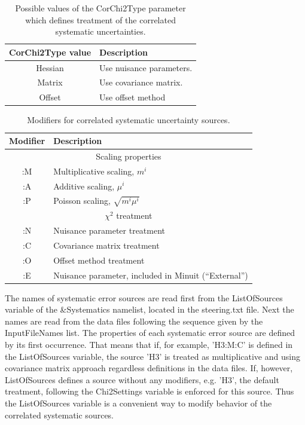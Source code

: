\begin{table}
\begin{center}
\begin{tabular}{cl}
\hline
    {\sc CorChi2Type} value &  Description \\
\hline
  {\sc Hessian}             & Use nuisance parameters.\\
  {\sc Matrix }             & Use covariance matrix. \\
  {\sc Offset }             & Use offset method\\
\hline
\end{tabular}
\end{center}
\caption{\label{tab:Chi2Type}Possible values of the {\sc CorChi2Type} parameter which defines treatment of the correlated systematic uncertainties.}
\end{table}
 
\begin{table}
\begin{center}
\begin{tabular}{cl}
\hline
  Modifier &  Description \\
\hline
   \multicolumn{2}{c}{Scaling properties}\\
  {\sc :M}  &  Multiplicative scaling, $ m^i$ \\
  {\sc :A}  &  Additive scaling, $ \mu^i$ \\
  {\sc :P}  &  Poisson scaling, $ \sqrt{m^i\mu^i}$ \\
   \multicolumn{2}{c}{$\chi^2$ treatment}\\
  {\sc :N}  &  Nuisance parameter treatment \\
  {\sc :C}  &  Covariance matrix treatment \\
  {\sc :O}  &  Offset method treatment \\
  {\sc :E}  &  Nuisance parameter, included in {\sc Minuit} (``External'')\\
\hline
\end{tabular}
\end{center}
\caption{\label{tab:SystModifier}Modifiers for correlated systematic
uncertainty sources.}
\end{table}

The names of systematic error sources are read first from the {\sc ListOfSources} variable of the 
{\sc \&Systematics} namelist, located in the {\sc steering.txt} file. Next the names are read from the
data files following the sequence given by the {\sc InputFileNames} list. The properties of each systematic
error source are defined by its first occurrence. That means that if, for example, {\sc 'H3:M:C'} is defined
in the {\sc ListOfSources} variable, the source {\sc 'H3'} is treated as multiplicative and using covariance
matrix approach regardless definitions in the data files. If, however, {\sc ListOfSources} defines a source
without any modifiers, e.g. {\sc 'H3'}, the default treatment, following the {\sc Chi2Settings} variable is
enforced for this source.
Thus the {\sc ListOfSources } variable is a convenient way to modify behavior of the correlated systematic
sources.

